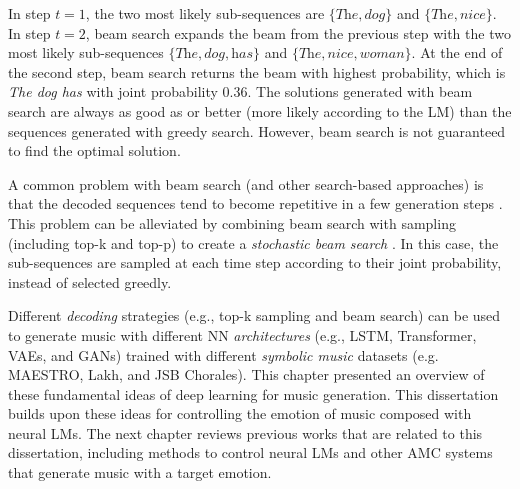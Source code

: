 In step $t=1$, the two most likely sub-sequences are $\{ \textit{The}, \textit{dog} \}$ and $\{ \textit{The}, \textit{nice} \}$. In step $t=2$, beam search expands the beam from the previous step with the two most likely sub-sequences $\{ \textit{The}, \textit{dog}, \textit{has} \}$ and $\{ \textit{The}, \textit{nice}, \textit{woman} \}$. At the end of the second step, beam search returns the beam with highest probability, which is \textit{The dog has} with joint probability $0.36$. The solutions generated with beam search are always as good as or better (more likely according to the LM) than the sequences generated with greedy search. However, beam search is not guaranteed to find the optimal solution.

A common problem with beam search (and other search-based approaches) is that the decoded sequences tend to become repetitive in a few generation steps \cite{holtzman2019curious}. This problem can be alleviated by combining beam search with sampling (including top-k and top-p) to create a \textit{stochastic beam search} \cite{poole2010artificial}. In this case, the sub-sequences are sampled at each time step according to their joint probability, instead of selected greedly.

Different \textit{decoding} strategies (e.g., top-k sampling and beam search) can be used to generate music with different NN \textit{architectures} (e.g., LSTM, Transformer, VAEs, and GANs) trained with different \textit{symbolic music} datasets (e.g. MAESTRO, Lakh, and JSB Chorales). This chapter presented an overview of these fundamental ideas of deep learning for music generation. This dissertation builds upon these ideas for controlling the emotion of music composed with neural LMs. The next chapter reviews previous works that are related to this dissertation, including methods to control neural LMs and other AMC systems that generate music with a target emotion.
